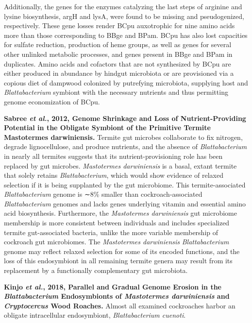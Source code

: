 \documentclass[11pt]{article}
\begin{document}
\begin{sloppypar}
Additionally, the genes for the enzymes catalyzing the last steps of arginine and lysine biosynthesis, argH and lysA, were found to be missing and pseudogenized, respectively. 
These gene losses render BCpu auxotrophic for nine amino acids more than those corresponding to BBge and BPam. 
BCpu has also lost capacities for sulfate reduction, production of heme groups, as well as genes for several other unlinked metabolic processes, and genes present in BBge and BPam in duplicates. 
Amino acids and cofactors that are not synthesized by BCpu are either produced in abundance by hindgut microbiota or are provisioned via a copious diet of dampwood colonized by putrefying microbiota, supplying host and \textit{Blattabacterium} symbiont with the necessary nutrients and thus permitting genome economization of BCpu.
\par
\textbf{Sabree \textit{et al.}, 2012, Genome Shrinkage and Loss of Nutrient-Providing Potential in the Obligate Symbiont of the Primitive Termite Mastotermes darwiniensis.} \newline
Termite gut microbes collaborate to fix nitrogen, degrade lignocellulose, and produce nutrients, and the absence of \textit{Blattabacterium} in nearly all termites suggests that its nutrient-provisioning role has been replaced by gut microbes. 
\textit{Mastotermes darwiniensis} is a basal, extant termite that solely retains \textit{Blattabacterium}, which would show evidence of relaxed selection if it is being supplanted by the gut microbiome. 
This termite-associated \textit{Blattabacterium} genome is ∼8\% smaller than cockroach-associated \textit{Blattabacterium} genomes and lacks genes underlying vitamin and essential amino acid biosynthesis. 
Furthermore, the \textit{Mastotermes darwiniensis} gut microbiome membership is more consistent between individuals and includes specialized termite gut-associated bacteria, unlike the more variable membership of cockroach gut microbiomes. 
The \textit{Mastotermes darwiniensis} \textit{Blattabacterium} genome may reflect relaxed selection for some of its encoded functions, and the loss of this endosymbiont in all remaining termite genera may result from its replacement by a functionally complementary gut microbiota.
\par
\textbf{Kinjo \textit{et al.}, 2018, Parallel and Gradual Genome Erosion in the \textit{Blattabacterium} Endosymbionts of \textit{Mastotermes darwiniensis} and \textit{Cryptocercus} Wood Roaches.} \newline
Almost all examined cockroaches harbor an obligate intracellular endosymbiont, \textit{Blattabacterium cuenoti}. 

\end{sloppypar}
\end{document}
